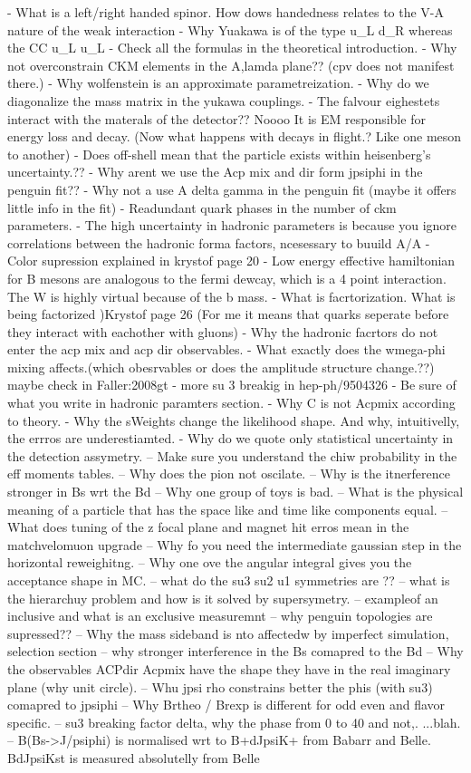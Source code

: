 - What is a left/right handed spinor. How dows handedness relates to the V-A nature of the weak interaction
- Why Yuakawa is of the type u_L d_R whereas the CC u_L u_L
- Check all the formulas in the theoretical introduction.
- Why not overconstrain CKM elements in the A,lamda plane?? (cpv does not manifest there.)
- Why wolfenstein is an approximate parametreization.
- Why do we diagonalize the mass matrix in the yukawa couplings.
- The falvour eighestets interact with the materals of the detector?? Noooo
  It is EM responsible for energy loss and decay. (Now what happens with decays in flight.? Like one meson to another)
- Does off-shell mean that the particle exists within heisenberg's uncertainty.??
- Why arent we use the Acp mix and dir form jpsiphi in the penguin fit??
- Why not a use A delta gamma in the penguin fit (maybe it offers little info in the fit)
- Readundant quark phases in the number of ckm parameters.
- The high uncertainty in hadronic parameters is because you ignore correlations between the hadronic forma factors, ncesessary to buuild A/A
- Color supression  explained in krystof page 20
- Low energy effective hamiltonian for B mesons are analogous to the fermi dewcay, which is a 4 point interaction. The W is highly virtual because of the b mass.
- What is facrtorization. What is being factorized )Krystof page 26 (For me it means that quarks seperate before they interact with eachother with gluons)
- Why the hadronic facrtors do not enter the acp mix and acp dir observables.
- What exactly does the wmega-phi mixing affects.(which obesrvables or does the amplitude structure change.??)  maybe check in  {Faller:2008gt}
- more su 3 breakig in hep-ph/9504326
- Be sure of what you write in hadronic paramters section.
- Why C is not Acpmix according to theory.
- Why the sWeights change the likelihood shape. And why, intuitivelly, the errros are underestiamted.
- Why do we quote only statistical uncertainty in the detection assymetry.
-- Make sure you understand the chiw probability in the eff moments tables.
-- Why does the pion not oscilate.
-- Why is the itnerference stronger in Bs wrt the Bd
-- Why one group of toys is bad.
-- What is the physical meaning of a particle that has the space like and time like components equal.
-- What does tuning of the z focal plane and magnet hit erros mean in the matchvelomuon upgrade
-- Why fo you need the intermediate gaussian step in the horizontal reweighitng.
-- Why one ove the angular \pdf integral gives you the acceptance shape in MC.
-- what do the su3 su2 u1 symmetries are ??
-- what is the hierarchuy problem and how is it solved by supersymetry.
-- exampleof an inclusive and what is an exclusive measuremnt
-- why penguin topologies are supressed??
-- Why the mass sideband is nto affectedw by imperfect simulation, selection section
-- why stronger interference in the Bs comapred to the Bd
-- Why the observables ACPdir Acpmix have the shape they have in the real imaginary plane (why unit circle).
-- Whu jpsi rho constrains better the phis (with su3) comapred to jpsiphi
-- Why Brtheo / Brexp is different for odd even and flavor specific.
-- su3 breaking factor delta, why the phase from 0 to 40 and not,. ...blah.
-- B(Bs->J/psiphi) is normalised wrt to B+dJpsiK+ from Babarr and Belle. BdJpsiKst is measured absolutelly from Belle

